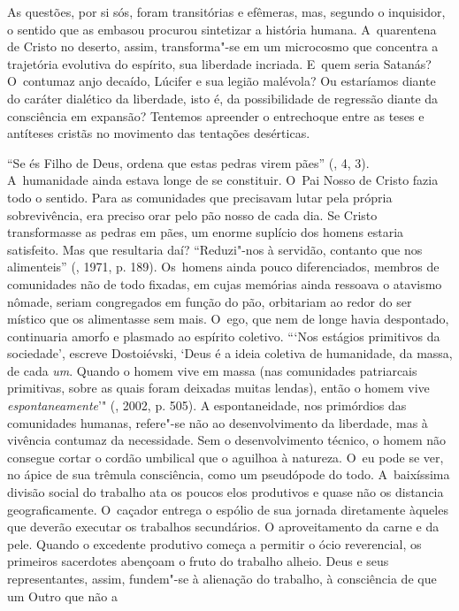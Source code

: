 As questões, por si sós, foram transitórias e efêmeras, mas, segundo o
inquisidor, o sentido que as embasou procurou sintetizar a história
humana. A~quarentena de Cristo no deserto, assim, transforma"-se em um
microcosmo que concentra a trajetória evolutiva do espírito, sua
liberdade incriada. E~quem seria Satanás? O~contumaz anjo decaído,
Lúcifer e sua legião malévola? Ou estaríamos diante do caráter dialético
da liberdade, isto é, da possibilidade de regressão diante da
consciência em expansão? Tentemos apreender o entrechoque entre as teses
e antíteses cristãs no movimento das tentações desérticas.

``Se és Filho de Deus, ordena que estas pedras virem pães'' (, 4,
3). A~humanidade ainda estava longe de se constituir. O~Pai Nosso de
Cristo fazia todo o sentido. Para as comunidades que precisavam lutar
pela própria sobrevivência, era preciso orar pelo pão nosso de cada dia.
Se Cristo transformasse as pedras em pães, um enorme suplício dos homens
estaria satisfeito. Mas que resultaria daí? ``Reduzi"-nos à servidão,
contanto que nos alimenteis'' (, 1971, p. 189). Os~homens
ainda pouco diferenciados, membros de comunidades não de todo fixadas,
em cujas memórias ainda ressoava o atavismo nômade, seriam congregados
em função do pão, orbitariam ao redor do ser místico que os alimentasse
sem mais. O~ego, que nem de longe havia despontado, continuaria amorfo e
plasmado ao espírito coletivo. ```Nos estágios primitivos da sociedade',
escreve Dostoiévski, `Deus é a ideia coletiva de humanidade, da massa,
de cada \emph{um}. Quando o homem vive em massa (nas comunidades
patriarcais primitivas, sobre as quais foram deixadas muitas lendas),
então o homem vive \emph{espontaneamente}'" (, 2002, p. 505). A
espontaneidade, nos primórdios das comunidades humanas, refere"-se não ao
desenvolvimento da liberdade, mas à vivência contumaz da necessidade.
Sem o desenvolvimento técnico, o homem não consegue cortar o cordão
umbilical que o aguilhoa à natureza. O~eu pode se ver, no ápice de sua
trêmula consciência, como um pseudópode do todo. A~baixíssima divisão
social do trabalho ata os poucos elos produtivos e quase não os
distancia geograficamente. O~caçador entrega o espólio de sua jornada
diretamente àqueles que deverão executar os trabalhos secundários. O
aproveitamento da carne e da pele. Quando o excedente produtivo começa a
permitir o ócio reverencial, os primeiros sacerdotes abençoam o fruto do
trabalho alheio. Deus e seus representantes, assim, fundem"-se à
alienação do trabalho, à consciência de que um Outro que não a
